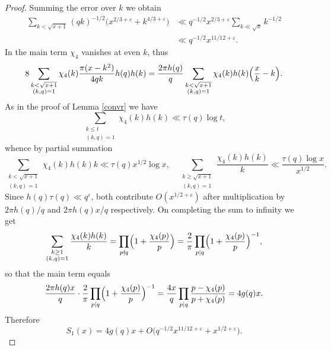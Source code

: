 \documentclass[10pt,a4paper]{amsart}
\begin{document}
\begin{proof}
    Summing the error over $k$ we obtain
    \[
        \begin{split}
            \sum_{k < \sqrt{x+1}}(qk)^{-1/2}\bigl(x^{2/3+\varepsilon}+k^{4/3+\varepsilon}\bigr)
            &\ll q^{-1/2}x^{2/3+\varepsilon}\sum_{k \ll \sqrt{x}} k^{-1/2} \\
            &\ll q^{-1/2} x^{11/12+\varepsilon}.
        \end{split}
    \]
    In the main term $\chi_4$ vanishes at even $k$, thus
    \[
        8\sum_{\substack{k<\sqrt{x+1}\\ (k,q)=1}}\chi_4(k)\frac{\pi(x-k^2)}{4qk}h(q)h(k)
        = \frac{2\pi h(q)}{q}\sum_{\substack{k<\sqrt{x+1}\\ (k,q)=1}}
          \chi_4(k)h(k)\Bigl(\frac{x}{k}-k\Bigr).
    \]
    As in the proof of Lemma \ref{convr} we have
    \[
        \sum_{\substack{k \le t \\ (k,q)=1}} \chi_4(k)h(k) \ll \tau(q)\log t,
    \]
    whence by partial summation
    \[
        \sum_{\substack{k<\sqrt{x+1}\\ (k,q)=1}}\chi_4(k)h(k)k \ll \tau(q)x^{1/2}\log x,
        \quad
        \sum_{\substack{k \ge \sqrt{x+1}\\ (k,q)=1}}\frac{\chi_4(k)h(k)}{k}
        \ll \frac{\tau(q)\log x}{x^{1/2}}.
    \]
    Since $h(q)\tau(q) \ll q^{\varepsilon}$, both contribute $O(x^{1/2+\varepsilon})$
    after multiplication by $2\pi h(q)/q$ and $2\pi h(q)x/q$ respectively. On completing the sum to infinity we get
    \[
        \sum_{\substack{k \ge 1\\ (k,q)=1}}\frac{\chi_4(k)h(k)}{k}
        = \prod_{p \nmid q}\Bigl(1+\frac{\chi_4(p)}{p}\Bigr)
        = \frac{2}{\pi}\prod_{p \mid q}\Bigl(1+\frac{\chi_4(p)}{p}\Bigr)^{-1},
    \]
    so that the main term equals
    \[
        \frac{2\pi h(q)x}{q}\cdot\frac{2}{\pi}
        \prod_{p \mid q}\Bigl(1+\frac{\chi_4(p)}{p}\Bigr)^{-1}
        = \frac{4x}{q}\prod_{p \mid q}\frac{p-\chi_4(p)}{p+\chi_4(p)} = 4g(q)x.
    \]
    Therefore
    \[
        S_1(x) = 4g(q)x + O\bigl(q^{-1/2}x^{11/12+\varepsilon}+x^{1/2+\varepsilon}\bigr).
    \]
    

\end{proof}
\end{document}
